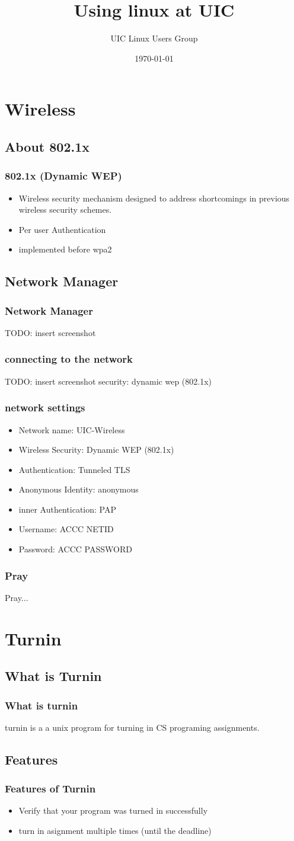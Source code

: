 \documentclass[hyperref={pdfpagelabels=false}]{beamer}
\title{Using linux at UIC}
\author{UIC Linux Users Group}
\date{\today}
\begin{document}
\frame{\titlepage}
\section{Wireless}
\subsection{About 802.1x}
\frame
{
    \frametitle{802.1x (Dynamic WEP)}
    \begin{itemize}
    \item{Wireless security mechanism designed to address shortcomings in previous wireless security schemes.}
    \item{Per user Authentication}
    \item{implemented before wpa2}
    \end{itemize}
}
\subsection{Network Manager}
\frame
{
    \frametitle{Network Manager}
    TODO: insert screenshot
}
\frame
{
    \frametitle{connecting to the network}
    TODO: insert screenshot
    security: dynamic wep (802.1x)
}
\frame
{
    \frametitle{network settings}
    \begin{itemize}
    \item{Network name: UIC-Wireless}
    \item{Wireless Security: Dynamic WEP (802.1x)}
    \item{Authentication: Tunneled TLS}
    \item{Anonymous Identity: anonymous}
    \item{inner Authentication: PAP}
    \item{Username: ACCC NETID}
    \item{Password: ACCC PASSWORD}
    \end{itemize}
}
\frame
{
    \frametitle{Pray}
    Pray...
}
\section{Turnin}
\subsection{What is Turnin}
\frame
{
    \frametitle{What is turnin}
    turnin is a a unix program for turning in CS programing assignments.
}

\subsection{Features}
\frame
{
    \frametitle{Features of Turnin}
    \begin{itemize}
    \item{Verify that your program was turned in successfully}
    \item{turn in asignment multiple times (until the deadline)}
    \end{itemize}
}
\end{document}
